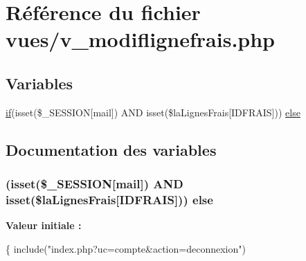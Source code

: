\hypertarget{v__modiflignefrais_8php}{}\section{Référence du fichier vues/v\+\_\+modiflignefrais.php}
\label{v__modiflignefrais_8php}
\subsection*{Variables}
\begin{DoxyCompactItemize}
\item 
\hyperlink{bootstrap_8min_8js_ab46cc49ddd78779f76bf855060e8f4db}{if}(isset(\$\+\_\+\+S\+E\+S\+S\+I\+O\+N\mbox{[}\textquotesingle{}mail\textquotesingle{}\mbox{]}) A\+N\+D isset(\$la\+Lignes\+Frais\mbox{[}\textquotesingle{}I\+D\+F\+R\+A\+I\+S\textquotesingle{}\mbox{]})) \hyperlink{v__modiflignefrais_8php_aa8b16dcca839fbe7578e09bb013e942e}{else}
\end{DoxyCompactItemize}


\subsection{Documentation des variables}
\hypertarget{v__modiflignefrais_8php_aa8b16dcca839fbe7578e09bb013e942e}{}
\subsubsection[{else}]{ (isset(\$\+\_\+\+S\+E\+S\+S\+I\+O\+N\mbox{[}\textquotesingle{}mail\textquotesingle{}\mbox{]}) A\+N\+D isset(\$la\+Lignes\+Frais\mbox{[}\textquotesingle{}I\+D\+F\+R\+A\+I\+S\textquotesingle{}\mbox{]})) else}\label{v__modiflignefrais_8php_aa8b16dcca839fbe7578e09bb013e942e}
{\bfseries Valeur initiale \+:}
\begin{DoxyCode}
\{
    include(\textcolor{stringliteral}{"index.php?uc=compte&action=deconnexion"})
\end{DoxyCode}
